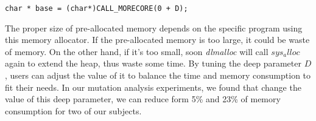 \begin{lstlisting}
char * base = (char*)CALL_MORECORE(0 + D);
\end{lstlisting}


The proper size of pre-allocated memory depends on the specific program using this memory allocator. If the pre-allocated memory is too large, it could be waste of memory. On the other hand, if it's too small, soon \emph{dlmalloc} will call $sys_alloc$ again to extend the heap, thus waste some time. By tuning the deep parameter $D$, users can adjust the value of it to balance the time and memory consumption to fit their needs. In our mutation analysis experiments,  we found that change the value of this deep parameter, we can reduce form 5\% and 23\% of memory consumption for two of our subjects.

